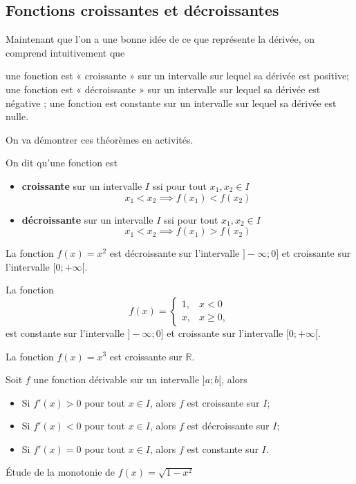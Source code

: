 \documentclass[a4paper,12pt]{article}
\begin{document}
\subsection{Fonctions croissantes et décroissantes}
Maintenant que l'on a une bonne idée de ce que représente la dérivée, on comprend intuitivement que 
\begin{tasks}
\task une fonction est « croissante » sur un intervalle sur lequel sa dérivée est positive;
\task une fonction est « décroissante » sur un intervalle sur lequel sa dérivée est négative ;
\task une fonction est constante sur un intervalle sur lequel sa dérivée est nulle.
\end{tasks}
On va démontrer ces théorèmes en activités. 
\begin{definition}
	\tcblower
	On dit qu'une fonction est
	\begin{itemize}
		\item {\bfseries croissante} sur un intervalle $I$ ssi pour tout $x_1, x_2\in I$
			\[x_1<x_2\implies f(x_1)<f(x_2)\]

		\item {\bfseries décroissante} sur un intervalle $I$ ssi pour tout $x_1, x_2\in I$
			\[x_1<x_2\implies f(x_1)>f(x_2)\]
	\end{itemize}
\end{definition}
\begin{exemple}
	\tcblower
La fonction $f(x)=x^2$ est décroissante sur l'intervalle $]-\infty;0]$ et croissante sur l'intervalle $[0;+\infty[$. 
\end{exemple}
\begin{exemple}
	\tcblower
	La fonction \[f(x)=\begin{cases}
		1,&x<0\\
		x,&x\geq 0,
	\end{cases}\]
	est constante sur l'intervalle $]-\infty;0]$ et croissante sur l'intervalle $[0;+\infty[$. 
\end{exemple}
\begin{exemple}
	\tcblower
	La fonction $f(x)=x^3$ est croissante sur $\mathbb{R}$.	
\end{exemple}
\begin{thm}
	\tcblower
	Soit $f$ une fonction dérivable sur un intervalle $]a;b[$, alors  
	\begin{itemize}
		\item Si $f'(x)>0$ pour tout $x\in I$, alors $f$ est croissante sur $I$;
		\item Si $f'(x)<0$ pour tout $x\in I$, alors $f$ est décroissante sur $I$;
		\item Si $f'(x)=0$ pour tout $x\in I$, alors $f$ est constante sur $I$.
	\end{itemize}
\end{thm}
\begin{exemple}
	\tcblower
	Étude de la monotonie de $f(x)=\sqrt{1-x^2}$
	\vspace{6cm}	
\end{exemple}
\end{document}
